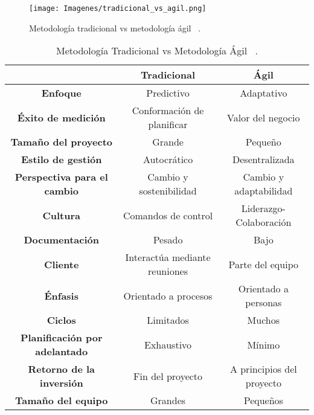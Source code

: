 \begin{figure}[h]
  \texttt{[image: Imagenes/tradicional\_vs\_agil.png]}
  \caption{\label{fig: dif_Metodologia} Metodología tradicional vs metodología ágil  ~\cite{5}.}
\end{figure}


\begin{table}[h]
    \caption{\label{tab: tab_dif_Metodologia} Metodología Tradicional vs Metodología Ágil ~\cite{5}. }
  
    \begin{tabular}{|c||cc|}
    \hline
      & \textbf{Tradicional} & \textbf{Ágil} \\
    
    \hline\hline
    
    \textbf{Enfoque} & Predictivo & Adaptativo\\

    \textbf{Éxito de medición}   & Conformación de planificar & Valor del negocio\\

    \textbf{Tamaño del proyecto} & Grande & Pequeño\\

    \textbf{Estilo de gestión} & Autocrático & Desentralizada \\

    \textbf{Perspectiva para el cambio} & Cambio y sostenibilidad & Cambio y adaptabilidad\\

    \textbf{Cultura} & Comandos de control & Liderazgo-Colaboración\\

    \textbf{Documentación} & Pesado & Bajo\\

    \textbf{Cliente} & Interactúa mediante reuniones & Parte del equipo\\

    \textbf{Énfasis} & Orientado a procesos & Orientado a personas\\
    
    \textbf{Ciclos} & Limitados & Muchos\\
    
    \textbf{Planificación por adelantado} & Exhaustivo & Mínimo\\
    
    \textbf{Retorno de la inversión} & Fin del proyecto & A principios del proyecto\\

    \textbf{Tamaño del equipo} & Grandes & Pequeños\\\hline
    \end{tabular}  
\end{table}

